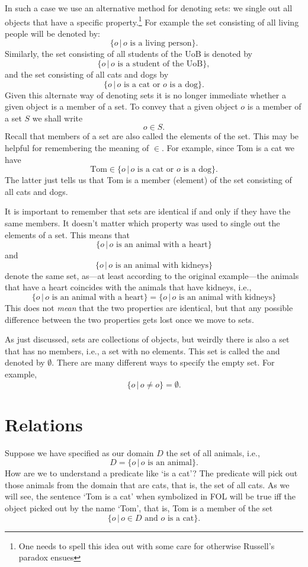 In such a case we use an alternative method for denoting sets: we single out all objects that have a specific property.\footnote{One needs to spell this idea out with some care for otherwise Russell's paradox ensues} For example the set consisting of all living people will be denoted by:
$$\{o\,|\,o\text{ is a living person}\}.$$
Similarly, the set consisting of all students of the UoB is denoted by
$$\{o\,|\,o\text{ is a student of the UoB}\},$$
and the set consisting of all cats and dogs by
$$\{o\,|\,o\text{ is a cat or }o\text{ is a dog}\}.$$
Given this alternate way of denoting sets it is no longer immediate whether a given object is a member of a set. To convey that a given object $o$ is a member of a set $S$ we shall write
$$o\in S.$$
Recall that members of a set are also called the elements of the set. This may be helpful for remembering the meaning of $\in$. For example, since Tom is a cat we have
$$\text{Tom}\in\{o\,|\,o\text{ is a cat or }o\text{ is a dog}\}.$$
The latter just tells us that Tom is a member (element) of the set consisting of all cats and dogs. 

It is important to remember that sets are identical if and only if they have the same members. It doesn't matter which property was used to single out the elements of a set. This means that 
$$\{o\,|\,o\text{ is an animal with a heart}\}$$
and $$\{o\,|\,o\text{ is an animal with kidneys}\}$$
denote the same set, as---at least according to the original example---the animals that have a heart coincides with the animals that have kidneys, i.e.,
$$\{o\,|\,o\text{ is an animal with a heart}\}=\{o\,|\,o\text{ is an animal with kidneys}\}$$
This does not \emph{mean} that the two properties are identical, but that any possible difference between the two properties gets lost once we move to sets.

As just discussed, sets are collections of objects, but weirdly there is also a set that has no members, i.e., a set with no elements. This set is called the  and denoted by $\emptyset$. There are many different ways to specify the empty set. For example,
$$\{o\,|\,o\neq o\}=\emptyset.$$



\section{Relations}
Suppose we have specified as our domain $D$ the set of all animals, i.e.,
$$D=\{o\,|\,o\text{ is an animal}\}.$$
How are we to understand a predicate like `is a cat'? The predicate will pick out those animals from the domain that are cats, that is, the set of all cats. As we will see, the sentence `Tom is a cat' when symbolized in FOL will be true iff the object picked out by the name `Tom', that is, Tom is a member of the set
$$\{o\,|\,o\in D\text{ and }o\text{ is a cat}\}.$$

